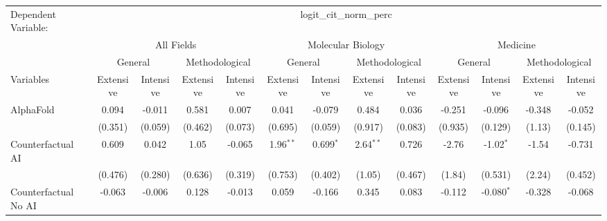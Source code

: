\begingroup
\centering
\begin{tabular}{lcccccccccccc}
   \tabularnewline \midrule \midrule
   Dependent Variable: & \multicolumn{12}{c}{logit\_cit\_norm\_perc}\\
 & \multicolumn{4}{c}{All Fields} & \multicolumn{4}{c}{Molecular Biology} & \multicolumn{4}{c}{Medicine} \\
\cmidrule(lr){2-5} \cmidrule(lr){6-9} \cmidrule(lr){10-13}
 & \multicolumn{2}{c}{General} & \multicolumn{2}{c}{Methodological} & \multicolumn{2}{c}{General} & \multicolumn{2}{c}{Methodological} & \multicolumn{2}{c}{General} & \multicolumn{2}{c}{Methodological} \\
\cmidrule(lr){2-3} \cmidrule(lr){4-5} \cmidrule(lr){6-7} \cmidrule(lr){8-9} \cmidrule(lr){10-11} \cmidrule(lr){12-13}
Variables & \multicolumn{1}{c}{Extensive} & \multicolumn{1}{c}{Intensive} & \multicolumn{1}{c}{Extensive} & \multicolumn{1}{c}{Intensive} & \multicolumn{1}{c}{Extensive} & \multicolumn{1}{c}{Intensive} & \multicolumn{1}{c}{Extensive} & \multicolumn{1}{c}{Intensive} & \multicolumn{1}{c}{Extensive} & \multicolumn{1}{c}{Intensive} & \multicolumn{1}{c}{Extensive} & \multicolumn{1}{c}{Intensive} \\
\cmidrule(lr){1-1}\cmidrule(lr){2-2} \cmidrule(lr){3-3} \cmidrule(lr){4-4} \cmidrule(lr){5-5} \cmidrule(lr){6-6} \cmidrule(lr){7-7} \cmidrule(lr){8-8} \cmidrule(lr){9-9} \cmidrule(lr){10-10} \cmidrule(lr){11-11} \cmidrule(lr){12-12} \cmidrule(lr){13-13}
   AlphaFold                                & 0.094   & -0.011  & 0.581        & 0.007   & 0.041       & -0.079        & 0.484       & 0.036          & -0.251  & -0.096       & -0.348  & -0.052\\   
                                            & (0.351) & (0.059) & (0.462)      & (0.073) & (0.695)     & (0.059)       & (0.917)     & (0.083)        & (0.935) & (0.129)      & (1.13)  & (0.145)\\   
   Counterfactual AI                        & 0.609   & 0.042   & 1.05         & -0.065  & 1.96$^{**}$ & 0.699$^{*}$   & 2.64$^{**}$ & 0.726          & -2.76   & -1.02$^{*}$  & -1.54   & -0.731\\   
                                            & (0.476) & (0.280) & (0.636)      & (0.319) & (0.753)     & (0.402)       & (1.05)      & (0.467)        & (1.84)  & (0.531)      & (2.24)  & (0.452)\\   
   Counterfactual No AI                     & -0.063  & -0.006  & 0.128        & -0.013  & 0.059       & -0.166        & 0.345       & 0.083          & -0.112  & -0.080$^{*}$ & -0.328  & -0.068\\   

\end{tabular}
